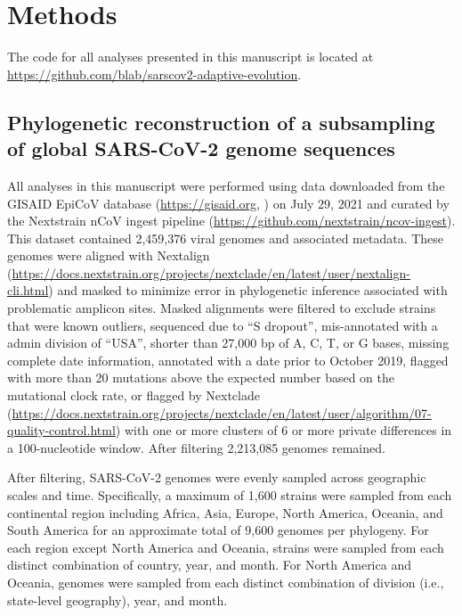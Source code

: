 \documentclass[12pt, letterpaper]{article}
\begin{document}
\section*{Methods}
\singlespacing
\sloppy
The code for all analyses presented in this manuscript is located at \url{https://github.com/blab/sarscov2-adaptive-evolution}.

\subsection*{Phylogenetic reconstruction of a subsampling of global SARS-CoV-2 genome sequences}
All analyses in this manuscript were performed using data downloaded from the GISAID EpiCoV database (\url{https://gisaid.org}, \citep{Shu2017-ql}) on July 29, 2021 and curated by the Nextstrain nCoV ingest pipeline (\url{https://github.com/nextstrain/ncov-ingest}). This dataset contained 2,459,376 viral genomes and associated metadata. These genomes were aligned with Nextalign (\url{https://docs.nextstrain.org/projects/nextclade/en/latest/user/nextalign-cli.html}) and masked to minimize error in phylogenetic inference associated with problematic amplicon sites. Masked alignments were filtered to exclude strains that were known outliers, sequenced due to “S dropout”, mis-annotated with a admin division of “USA”, shorter than 27,000 bp of A, C, T, or G bases, missing complete date information, annotated with a date prior to October 2019, flagged with more than 20 mutations above the expected number based on the mutational clock rate, or flagged by Nextclade (\url{https://docs.nextstrain.org/projects/nextclade/en/latest/user/algorithm/07-quality-control.html}) with one or more clusters of 6 or more private differences in a 100-nucleotide window. After filtering 2,213,085 genomes remained.

After filtering, SARS-CoV-2 genomes were evenly sampled across geographic scales and time. Specifically, a maximum of 1,600 strains were sampled from each continental region including Africa, Asia, Europe, North America, Oceania, and South America for an approximate total of 9,600 genomes per phylogeny. For each region except North America and Oceania, strains were sampled from each distinct combination of country, year, and month. For North America and Oceania, genomes were sampled from each distinct combination of division (i.e., state-level geography), year, and month.
\end{document}

